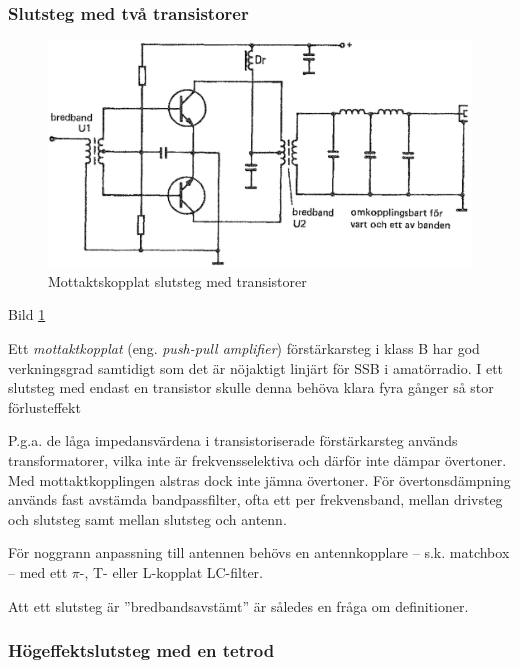 \subsubsection{Slutsteg med två transistorer}

\begin{figure}
\includegraphics[width=\textwidth]{images/cropped_pdfs/bild_2_3-49.pdf}
\caption{Mottaktskopplat slutsteg med transistorer}
\label{fig:BildII3-49}
\end{figure}

Bild \ref{fig:BildII3-49}

Ett \emph{mottaktkopplat} (eng. \emph{push-pull amplifier}) förstärkarsteg i
klass B har god verkningsgrad samtidigt som det är nöjaktigt linjärt för SSB i
amatörradio. I ett slutsteg med endast en transistor skulle denna
behöva klara fyra gånger så stor förlusteffekt

P.g.a. de låga impedansvärdena i transistoriserade förstärkarsteg
används transformatorer, vilka inte är frekvensselektiva och därför
inte dämpar övertoner. Med mottaktkopplingen alstras dock inte jämna
övertoner. För övertonsdämpning används fast avstämda bandpassfilter,
ofta ett per frekvensband, mellan drivsteg och slutsteg samt mellan
slutsteg och antenn.

För noggrann anpassning till antennen behövs en antennkopplare --
s.k. matchbox -- med ett \(\pi \)-, T- eller L-kopplat LC-filter.

Att ett slutsteg är ''bredbandsavstämt'' är således en fråga om
definitioner.

\subsubsection{Högeffektslutsteg med en tetrod}

